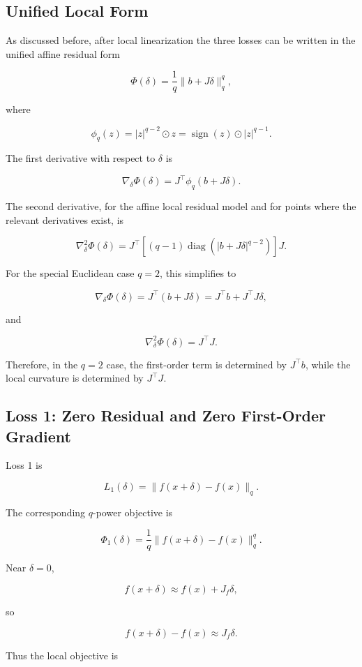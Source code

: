 \documentclass{article}
\begin{document}
\subsection{Unified Local Form}

As discussed before, after local linearization the three losses can be written in the unified affine residual form

\[
\Phi(\delta)
=
\frac{1}{q}\|b+J\delta\|_q^q,
\]

where

\[
\phi_q(z)
=
|z|^{q-2}\odot z
=
\operatorname{sign}(z)\odot |z|^{q-1}.
\]

The first derivative with respect to \(\delta\) is

\[
\nabla_\delta \Phi(\delta)
=
J^\top\phi_q(b+J\delta).
\]

The second derivative, for the affine local residual model and for points where the relevant derivatives exist, is

\[
\nabla_\delta^2 \Phi(\delta)
=
J^\top
\left[
(q-1)\operatorname{diag}\left(|b+J\delta|^{q-2}\right)
\right]
J.
\]

For the special Euclidean case \(q=2\), this simplifies to

\[
\nabla_\delta \Phi(\delta)
=
J^\top(b+J\delta)
=
J^\top b+J^\top J\delta,
\]

and

\[
\nabla_\delta^2\Phi(\delta)
=
J^\top J.
\]

Therefore, in the \(q=2\) case, the first-order term is determined by \(J^\top b\), while the local curvature is determined by \(J^\top J\).

\subsection{Loss 1: Zero Residual and Zero First-Order Gradient}

Loss 1 is

\[
L_1(\delta)
=
\|f(x+\delta)-f(x)\|_q.
\]

The corresponding \(q\)-power objective is

\[
\Phi_1(\delta)
=
\frac{1}{q}
\|f(x+\delta)-f(x)\|_q^q.
\]

Near \(\delta=0\),

\[
f(x+\delta)
\approx
f(x)+J_f\delta,
\]

so

\[
f(x+\delta)-f(x)
\approx
J_f\delta.
\]

Thus the local objective is
\end{document}

